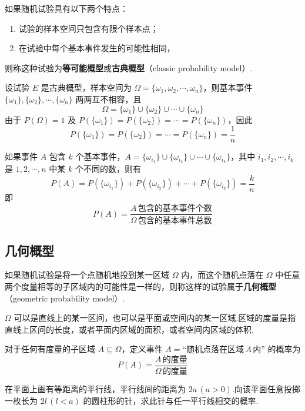 如果随机试验具有以下两个特点：
\begin{enumerate}
    \item 试验的样本空间只包含有限个样本点；
    \item 在试验中每个基本事件发生的可能性相同，
\end{enumerate}
则称这种试验为\textbf{等可能概型}或\textbf{古典概型}（classic probability model）.

设试验 $E$ 是古典概型，样本空间为 $\varOmega=\{\omega_1,\omega_2,\cdots,\omega_n\}$，则基本事件 $\{\omega_1\},\{\omega_2\},\cdots,\{\omega_n\}$ 两两互不相容，且
$$
\varOmega = \{\omega_1\} \cup \{\omega_2\} \cup \cdots \cup \{\omega_n\}
$$
由于 $P(\varOmega)=1$ 及 $P(\{\omega_1\})=P(\{\omega_2\})=\cdots=P(\{\omega_n\})$，因此
$$
P(\{\omega_1\})=P(\{\omega_2\})=\cdots=P(\{\omega_n\})=\dfrac{1}{n}
$$

如果事件 $A$ 包含 $k$ 个基本事件，$A=\{\omega_{i_1}\} \cup \{\omega_{i_2}\} \cup \cdots \cup \{\omega_{i_k}\}$，其中 $i_1,i_2,\cdots,i_k$ 是 $1,2,\cdots,n$ 中某 $k$ 个不同的数，则有
$$
P(A) = P(\{\omega_{i_1}\}) + P(\{\omega_{i_2}\}) + \cdots + P(\{\omega_{i_k}\}) = \dfrac{k}{n}
$$
即
$$
P(A)=\dfrac{A\,\text{包含的基本事件个数}}{\varOmega\,\text{包含的基本事件总数}}
$$

\subsection{几何概型}

如果随机试验是将一个点随机地投到某一区域 $\varOmega$ 内，而这个随机点落在 $\varOmega$ 中任意两个度量相等的子区域内的可能性是一样的，则称这样的试验属于\textbf{几何概型}（geometric probability model）.

\begin{note}
    $\varOmega$ 可以是直线上的某一区间，也可以是平面或空间内的某一区域.区域的度量是指直线上区间的长度，或者平面内区域的面积，或者空间内区域的体积.
\end{note}

对于任何有度量的子区域 $A \subseteq \varOmega$，定义事件 $A = \text{“随机点落在区域}\, A \,\text{内”}$ 的概率为
$$
P(A)=\dfrac{A\,\text{的度量}}{\varOmega\,\text{的度量}}
$$

\begin{problem}[(蒲丰投针问题)]
    在平面上画有等距离的平行线，平行线间的距离为 $2a \, (a>0)$.向该平面任意投掷一枚长为 $2l \, (l<a)$ 的圆柱形的针，求此针与任一平行线相交的概率.
\end{problem}

